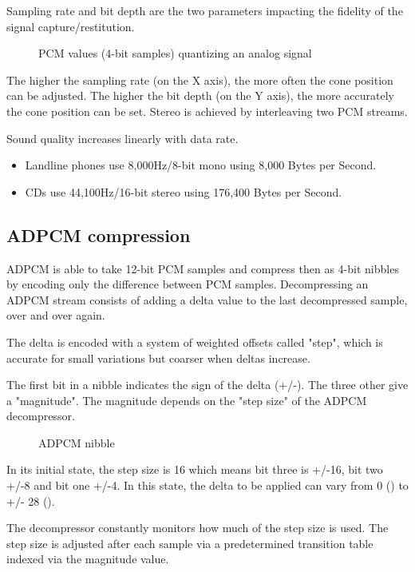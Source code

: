 Sampling rate and bit depth are the two parameters impacting the fidelity of the signal capture/restitution.

\begin{figure}[H]
\caption*{PCM values (4-bit samples) quantizing an analog signal}
\end{figure}


The higher the sampling rate (on the X axis), the more often the cone position can be adjusted. The higher the bit depth (on the Y axis), the more accurately the cone position can be set. Stereo is achieved by interleaving two PCM streams.





Sound quality increases linearly with data rate.
\begin{itemize}[topsep=0pt]
\item Landline phones use 8,000Hz/8-bit mono using 8,000 Bytes per Second.
\item CDs use 44,100Hz/16-bit stereo using 176,400 Bytes per Second.
\end{itemize}



\subsection{ADPCM compression}
ADPCM is able to take 12-bit PCM samples and compress then as 4-bit nibbles by encoding only the difference between PCM samples. Decompressing an ADPCM stream consists of adding a delta value to the last decompressed  sample, over and over again.

The delta is encoded with a system of weighted offsets called "step", which is accurate for small variations but coarser when deltas increase. 

The first bit in a nibble indicates the sign of the delta (+/-). The three other give a "magnitude". The magnitude depends on the "step size" of the ADPCM decompressor.

\begin{figure}[H]
\caption*{ADPCM nibble}
\end{figure}


In its initial state, the step size is 16 which means bit three is +/-16, bit two +/-8 and bit one +/-4. In this state, the delta to be applied can vary from 0 () to +/- 28 (). 

The decompressor constantly monitors how much of the step size is used. The step size is adjusted after each sample via a  predetermined transition table indexed via the magnitude value. 

